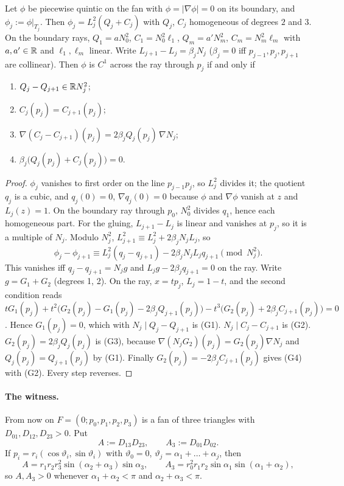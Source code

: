 \begin{lemma}[Gluing]\label{m3:glue}
Let $\phi$ be piecewise quintic on the fan with $\phi=|\nabla\phi|=0$ on its boundary, and $\phi_j:=\phi|_{T_j}$. Then $\phi_j=L_j^2(Q_j+C_j)$ with $Q_j$, $C_j$ homogeneous of degrees $2$ and $3$. On the boundary rays, $Q_1=aN_0^2$, $C_1=N_0^2\ell_1$, $Q_m=a'N_m^2$, $C_m=N_m^2\ell_m$ with $a,a'\in\mathbb R$ and $\ell_1,\ell_m$ linear. Write $L_{j+1}-L_j=\beta_jN_j$ ($\beta_j=0$ iff $p_{j-1},p_j,p_{j+1}$ are collinear). Then $\phi$ is $C^1$ across the ray through $p_j$ if and only if
\begin{enumerate}[label=(G\arabic*)]
\item $Q_j-Q_{j+1}\in\mathbb R N_j^2$;
\item $C_j(p_j)=C_{j+1}(p_j)$;
\item $\nabla(C_j-C_{j+1})(p_j)=2\beta_jQ_j(p_j)\,\nabla N_j$;
\item $\beta_j\bigl(Q_j(p_j)+C_j(p_j)\bigr)=0$.
\end{enumerate}
\end{lemma}

\begin{proof}
$\phi_j$ vanishes to first order on the line $p_{j-1}p_j$, so $L_j^2$ divides it; the quotient $q_j$ is a cubic, and $q_j(0)=0$, $\nabla q_j(0)=0$ because $\phi$ and $\nabla\phi$ vanish at $z$ and $L_j(z)=1$. On the boundary ray through $p_0$, $N_0^2$ divides $q_1$, hence each homogeneous part. For the gluing, $L_{j+1}-L_j$ is linear and vanishes at $p_j$, so it is a multiple of $N_j$. Modulo $N_j^2$, $L_{j+1}^2\equiv L_j^2+2\beta_jN_jL_j$, so
\[
\phi_j-\phi_{j+1}\equiv L_j^2(q_j-q_{j+1})-2\beta_jN_jL_jq_{j+1}\pmod{N_j^2}.
\]
This vanishes iff $q_j-q_{j+1}=N_jg$ and $L_jg-2\beta_jq_{j+1}=0$ on the ray. Write $g=G_1+G_2$ (degrees 1, 2). On the ray, $x=tp_j$, $L_j=1-t$, and the second condition reads $tG_1(p_j)+t^2\bigl(G_2(p_j)-G_1(p_j)-2\beta_jQ_{j+1}(p_j)\bigr)-t^3\bigl(G_2(p_j)+2\beta_jC_{j+1}(p_j)\bigr)=0$. Hence $G_1(p_j)=0$, which with $N_j\mid Q_j-Q_{j+1}$ is (G1). $N_j\mid C_j-C_{j+1}$ is (G2). $G_2(p_j)=2\beta_jQ_j(p_j)$ is (G3), because $\nabla(N_jG_2)(p_j)=G_2(p_j)\nabla N_j$ and $Q_j(p_j)=Q_{j+1}(p_j)$ by (G1). Finally $G_2(p_j)=-2\beta_jC_{j+1}(p_j)$ gives (G4) with (G2). Every step reverses.
\end{proof}

\paragraph{The witness.} From now on $F=(0;p_0,p_1,p_2,p_3)$ is a fan of three triangles with $D_{01},D_{12},D_{23}>0$. Put
\[
A:=D_{13}D_{23},\qquad A_3:=D_{01}D_{02}.
\]
If $p_i=r_i(\cos\vartheta_i,\sin\vartheta_i)$ with $\vartheta_0=0$, $\vartheta_j=\alpha_1+\dots+\alpha_j$, then
\begin{equation}\label{m3:signs}
A=r_1r_2r_3^2\sin(\alpha_2+\alpha_3)\sin\alpha_3,\qquad A_3=r_0^2r_1r_2\sin\alpha_1\sin(\alpha_1+\alpha_2),
\end{equation}
so $A,A_3>0$ whenever $\alpha_1+\alpha_2<\pi$ and $\alpha_2+\alpha_3<\pi$.

